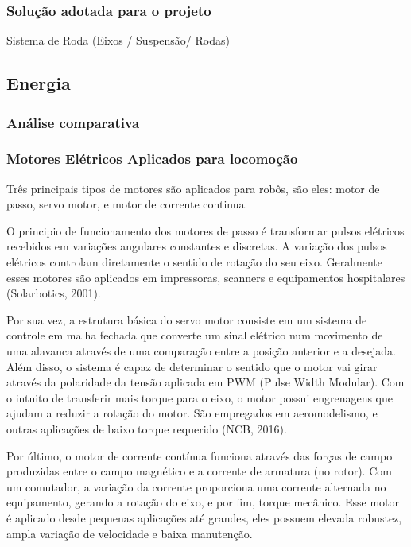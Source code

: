 \subsubsection{Solução adotada para o projeto}

Sistema de Roda (Eixos / Suspensão/ Rodas)

\subsection{Energia}

\subsubsection{Análise comparativa}

\subsubsection{Motores Elétricos Aplicados para locomoção}

Três principais tipos de motores são aplicados para robôs, são eles: motor de passo, servo motor, e motor de corrente continua.

O principio de funcionamento dos motores de passo é transformar pulsos elétricos recebidos em variações angulares constantes e discretas. A variação dos pulsos elétricos controlam diretamente o sentido de rotação do seu eixo. Geralmente esses motores são aplicados em impressoras, scanners e equipamentos hospitalares (Solarbotics, 2001).  

Por sua vez, a estrutura  básica do servo motor consiste em um sistema de controle em malha fechada que converte um sinal elétrico num movimento de uma alavanca através de uma comparação entre a posição anterior e a desejada. Além disso, o sistema é capaz de determinar o sentido que o motor vai girar através da polaridade da tensão aplicada em PWM (Pulse Width Modular). Com o intuito de transferir mais torque para o eixo, o motor possui engrenagens que ajudam a reduzir a rotação do motor. São empregados em aeromodelismo, e outras aplicações de baixo torque requerido (NCB, 2016).

Por último, o motor de corrente contínua funciona através das forças de campo produzidas entre o campo magnético e a corrente de armatura (no rotor). Com um comutador, a variação da corrente proporciona uma corrente alternada no equipamento, gerando a rotação do eixo, e por fim, torque mecânico. Esse motor é aplicado desde pequenas aplicações até grandes, eles possuem elevada robustez, ampla variação de velocidade e baixa manutenção.

